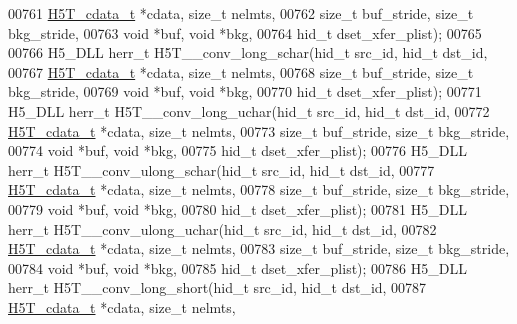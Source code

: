 \begin{DoxyCode}
00761                     \hyperlink{struct_h5_t__cdata__t}{H5T\_cdata\_t} *cdata, \textcolor{keywordtype}{size\_t} nelmts,
00762                     \textcolor{keywordtype}{size\_t} buf\_stride, \textcolor{keywordtype}{size\_t} bkg\_stride,
00763                                     \textcolor{keywordtype}{void} *buf, \textcolor{keywordtype}{void} *bkg,
00764                                     hid\_t dset\_xfer\_plist);
00765 
00766 H5\_DLL herr\_t H5T\_\_conv\_long\_schar(hid\_t src\_id, hid\_t dst\_id,
00767                    \hyperlink{struct_h5_t__cdata__t}{H5T\_cdata\_t} *cdata, \textcolor{keywordtype}{size\_t} nelmts,
00768                    \textcolor{keywordtype}{size\_t} buf\_stride, \textcolor{keywordtype}{size\_t} bkg\_stride,
00769                                    \textcolor{keywordtype}{void} *buf, \textcolor{keywordtype}{void} *bkg,
00770                                    hid\_t dset\_xfer\_plist);
00771 H5\_DLL herr\_t H5T\_\_conv\_long\_uchar(hid\_t src\_id, hid\_t dst\_id,
00772                    \hyperlink{struct_h5_t__cdata__t}{H5T\_cdata\_t} *cdata, \textcolor{keywordtype}{size\_t} nelmts,
00773                    \textcolor{keywordtype}{size\_t} buf\_stride, \textcolor{keywordtype}{size\_t} bkg\_stride,
00774                                    \textcolor{keywordtype}{void} *buf, \textcolor{keywordtype}{void} *bkg,
00775                                    hid\_t dset\_xfer\_plist);
00776 H5\_DLL herr\_t H5T\_\_conv\_ulong\_schar(hid\_t src\_id, hid\_t dst\_id,
00777                     \hyperlink{struct_h5_t__cdata__t}{H5T\_cdata\_t} *cdata, \textcolor{keywordtype}{size\_t} nelmts,
00778                     \textcolor{keywordtype}{size\_t} buf\_stride, \textcolor{keywordtype}{size\_t} bkg\_stride,
00779                                     \textcolor{keywordtype}{void} *buf, \textcolor{keywordtype}{void} *bkg,
00780                                     hid\_t dset\_xfer\_plist);
00781 H5\_DLL herr\_t H5T\_\_conv\_ulong\_uchar(hid\_t src\_id, hid\_t dst\_id,
00782                     \hyperlink{struct_h5_t__cdata__t}{H5T\_cdata\_t} *cdata, \textcolor{keywordtype}{size\_t} nelmts,
00783                     \textcolor{keywordtype}{size\_t} buf\_stride, \textcolor{keywordtype}{size\_t} bkg\_stride,
00784                                     \textcolor{keywordtype}{void} *buf, \textcolor{keywordtype}{void} *bkg,
00785                                     hid\_t dset\_xfer\_plist);
00786 H5\_DLL herr\_t H5T\_\_conv\_long\_short(hid\_t src\_id, hid\_t dst\_id,
00787                    \hyperlink{struct_h5_t__cdata__t}{H5T\_cdata\_t} *cdata, \textcolor{keywordtype}{size\_t} nelmts,

\end{DoxyCode}
